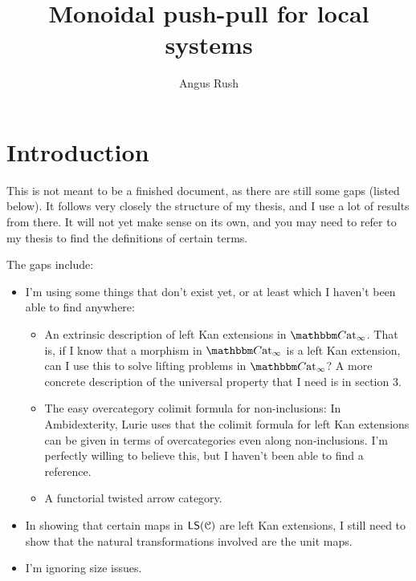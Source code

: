 \documentclass[a4paper,12pt]{scrartcl}
\title{Monoidal push-pull for local systems}
\author{Angus Rush}
\begin{document}
\maketitle 
\tableofcontents

\section{Introduction}
\label{sec:introduction}

This is not meant to be a finished document, as there are still some gaps (listed below). It follows very closely the structure of my thesis, and I use a lot of results from there. It will not yet make sense on its own, and you may need to refer to my thesis to find the definitions of certain terms.

The gaps include:

\begin{itemize}
  \item I'm using some things that don't exist yet, or at least which I haven't been able to find anywhere:
    \begin{itemize}
      \item An extrinsic description of left Kan extensions in $\ICCat$. That is, if I know that a morphism in $\ICCat$ is a left Kan extension, can I use this to solve lifting problems in $\ICCat$? A more concrete description of the universal property that I need is in section 3.

      \item The easy overcategory colimit formula for non-inclusions: In Ambidexterity, Lurie uses that the colimit formula for left Kan extensions can be given in terms of overcategories even along non-inclusions. I'm perfectly willing to believe this, but I haven't been able to find a reference.

      \item A functorial twisted arrow category.
    \end{itemize}

  \item In showing that certain maps in $\mathsf{LS}(\mathcal{C})$ are left Kan extensions, I still need to show that the natural transformations involved are the unit maps.

  \item I'm ignoring size issues.
\end{itemize}

%




%

\end{document}
